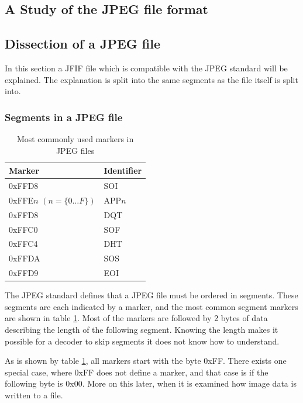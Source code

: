 \begin{infobox}{\section[A Study of the JPEG file format]{A Study of the JPEG file format}}
\subsection*{Dissection of a JPEG file}
In this section a JFIF file which is compatible with the JPEG standard will be explained. The explanation is split into the same segments as the file itself is split into.
\subsubsection*{Segments in a JPEG file}
\begin{table}
\caption{Most commonly used markers in JPEG files}
\label{tab:markers}
\begin{tabular}{|p{2.7cm}|l|}
\hline
Marker & Identifier\\ \hline
0xFFD8 & SOI\\ \hline
0xFFE$n$ \newline$(n = \{0 \ldots F\})$ & APP$n$\\ \hline
0xFFD8 & DQT \\ \hline
0xFFC0 & SOF \\ \hline
0xFFC4 & DHT\\ \hline
0xFFDA & SOS\\ \hline
0xFFD9 & EOI\\ \hline 
\end{tabular}
\end{table}

The JPEG standard defines that a JPEG file must be ordered in segments. These segments are each indicated by a marker, and the most common segment markers are shown in table \ref{tab:markers}. Most of the markers are followed by 2 bytes of data describing the length of the following segment. Knowing the length makes it possible for a decoder to skip segments it does not know how to understand. 

As is shown by table \ref{tab:markers}, all markers start with the byte 0xFF. There exists one special case, where 0xFF does not define a marker, and that case is if the following byte is 0x00. More on this later, when it is examined how image data is written to a file.


\end{infobox}
